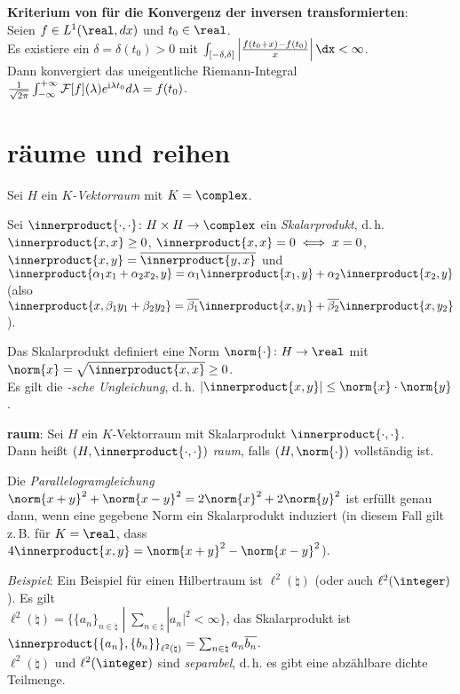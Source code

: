 \textbf{Kriterium von  für die Konvergenz der inversen
transformierten}:\\
Seien $f \in L^1(\real, dx)$ und $t_0 \in \real$.\\
Es existiere ein $\delta = \delta(t_0) > 0$ mit
$\int_{[-\delta, \delta]}
\left|\frac{f(t_0 + x) - f(t_0)}{x}\right| \dx < \infty$.\\
Dann konvergiert das uneigentliche Riemann-Integral
$\frac{1}{\sqrt{2\pi}}
\int_{-\infty}^{+\infty} \mathcal{F}[f](\lambda) e^{\mathrm{i} \lambda t_0} d\lambda = f(t_0)$.

\pagebreak

\section{%
    räume und reihen%
}

Sei $H$ ein \emph{$K$-Vektorraum} mit $K = \complex$.

Sei $\innerproduct{\cdot, \cdot}\colon H \times H \rightarrow \complex$
ein \emph{Skalarprodukt}, d.\,h.
$\innerproduct{x, x} \ge 0$,
$\innerproduct{x, x} = 0 \iff x = 0$,
$\innerproduct{x, y} = \overline{\innerproduct{y, x}}$ und
$\innerproduct{\alpha_1 x_1 + \alpha_2 x_2, y} =
\alpha_1 \innerproduct{x_1, y} + \alpha_2 \innerproduct{x_2, y}$
(also $\innerproduct{x, \beta_1 y_1 + \beta_2 y_2} =
\overline{\beta_1} \innerproduct{x, y_1} + \overline{\beta_2} \innerproduct{x, y_2}$).

Das Skalarprodukt definiert eine Norm $\norm{\cdot}\colon H \rightarrow \real$
mit $\norm{x} = \sqrt{\innerproduct{x, x}} \ge 0$.\\
Es gilt die \emph{-sche Ungleichung}, d.\,h.
$|\innerproduct{x, y}| \le \norm{x} \cdot \norm{y}$.

\textbf{raum}:
Sei $H$ ein $K$-Vektorraum mit Skalarprodukt $\innerproduct{\cdot, \cdot}$.\\
Dann heißt $(H, \innerproduct{\cdot, \cdot})$ \emph{raum}, falls
$(H, \norm{\cdot})$ vollständig ist.

Die \emph{Parallelogramgleichung}
$\norm{x + y}^2 + \norm{x - y}^2 = 2 \norm{x}^2 + 2 \norm{y}^2$ ist
erfüllt genau dann, wenn eine gegebene Norm ein Skalarprodukt induziert
(in diesem Fall gilt z.\,B. für $K = \real$, dass
$4 \innerproduct{x, y} = \norm{x + y}^2 - \norm{x - y}^2$).

\linie

\emph{Beispiel}:
Ein Beispiel für einen Hilbertraum ist
$\ell^2(\natural)$ (oder auch $\ell^2(\integer)$).
Es gilt\\
$\ell^2(\natural) = \{\{a_n\}_{n \in \natural} \;|\;
\sum_{n \in \natural} |a_n|^2 < \infty\}$,
das Skalarprodukt ist
$\innerproduct{\{a_n\}, \{b_n\}}_{\ell^2(\natural)} =
\sum_{n \in \natural} a_n \overline{b_n}$.\\
$\ell^2(\natural)$ und $\ell^2(\integer)$ sind \emph{separabel}, d.\,h.
es gibt eine abzählbare dichte Teilmenge.

